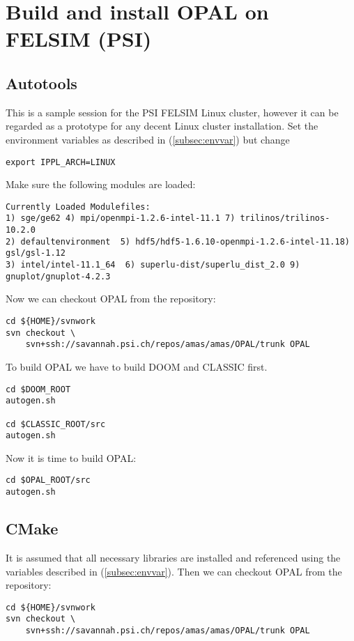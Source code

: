 \section{Build and install OPAL on FELSIM (PSI)}
\subsection{Autotools}
This is a sample session for the PSI FELSIM Linux cluster, however it can be regarded as a prototype for any decent Linux cluster
installation. Set the environment variables as described in  (\ref{subsec:envvar}) but change
\begin{footnotesize}
\begin{verbatim}
export IPPL_ARCH=LINUX
\end{verbatim}
\end{footnotesize}
Make sure the following modules are loaded:
\begin{footnotesize}
\begin{verbatim}
Currently Loaded Modulefiles:
1) sge/ge62 4) mpi/openmpi-1.2.6-intel-11.1 7) trilinos/trilinos-10.2.0
2) defaultenvironment  5) hdf5/hdf5-1.6.10-openmpi-1.2.6-intel-11.18) gsl/gsl-1.12
3) intel/intel-11.1_64  6) superlu-dist/superlu_dist_2.0 9) gnuplot/gnuplot-4.2.3
\end{verbatim}
\end{footnotesize}
Now we can checkout OPAL from the repository: 
\begin{footnotesize}
\begin{verbatim}
cd ${HOME}/svnwork
svn checkout \
    svn+ssh://savannah.psi.ch/repos/amas/amas/OPAL/trunk OPAL
\end{verbatim}
\end{footnotesize}
To build OPAL we have to build DOOM and CLASSIC first.
\begin{footnotesize}
\begin{verbatim}
cd $DOOM_ROOT
autogen.sh

cd $CLASSIC_ROOT/src
autogen.sh
\end{verbatim}
\end{footnotesize}
Now it is time to build OPAL:
\begin{footnotesize}
\begin{verbatim}
cd $OPAL_ROOT/src
autogen.sh
\end{verbatim}
\end{footnotesize}

\subsection{CMake}
It is assumed that all necessary libraries are installed and referenced using the variables described in (\ref{subsec:envvar}).
Then we can checkout OPAL from the repository: 
\begin{footnotesize}
\begin{verbatim}
cd ${HOME}/svnwork
svn checkout \
    svn+ssh://savannah.psi.ch/repos/amas/amas/OPAL/trunk OPAL
\end{verbatim}
\end{footnotesize}

